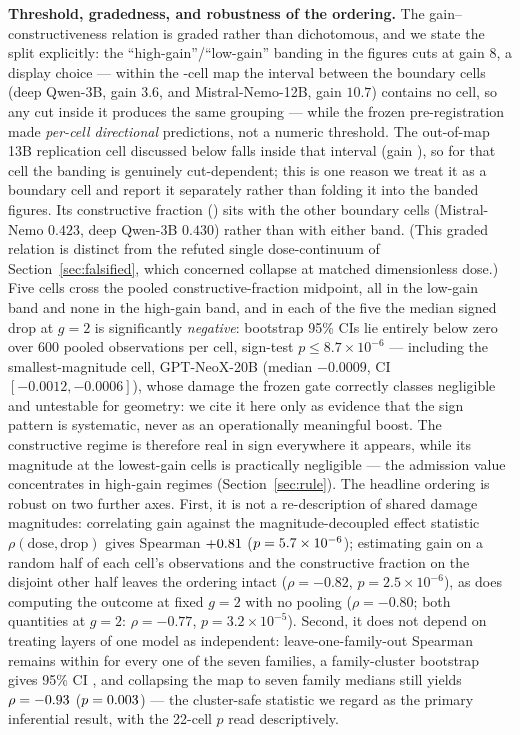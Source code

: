\documentclass[preprint,12pt]{elsarticle}
\theoremstyle{definition}
\begin{document}
\textbf{Threshold, gradedness, and robustness of the ordering.} The
gain--constructiveness relation is graded rather than dichotomous, and we state the
split explicitly: the ``high-gain''/``low-gain'' banding in the figures cuts at gain
$8$, a display choice --- within the \nCells{}-cell map the interval between the
boundary cells (deep Qwen-3B, gain $3.6$, and Mistral-Nemo-12B, gain $10.7$) contains no
cell, so any cut inside it produces the same grouping --- while the
frozen pre-registration made \emph{per-cell directional} predictions, not a numeric
threshold. The out-of-map 13B replication cell discussed below falls inside that
interval (gain \gainThirteenB{}), so for that cell the banding is genuinely
cut-dependent; this is one reason we treat it as a boundary cell and report it
separately rather than folding it into the banded figures. Its constructive fraction
(\fracThirteenB{}) sits with the other boundary cells (Mistral-Nemo $0.423$, deep
Qwen-3B $0.430$) rather than with either band. (This graded relation is distinct from the refuted single dose-continuum
of Section~\ref{sec:falsified}, which concerned collapse at matched dimensionless
dose.) Five cells cross the pooled constructive-fraction midpoint, all in the
low-gain band and none in the high-gain band, and in each of the five the median
signed drop at $g{=}2$ is significantly \emph{negative}: bootstrap 95\% CIs lie
entirely below zero over 600 pooled observations per cell, sign-test
$p\leq 8.7\times10^{-6}$ --- including the smallest-magnitude cell, GPT-NeoX-20B
(median $-0.0009$, CI $[-0.0012,-0.0006]$), whose damage the frozen gate correctly
classes negligible and untestable for geometry: we cite it here only as evidence that
the sign pattern is systematic, never as an operationally meaningful boost. The
constructive regime is therefore real in sign everywhere it appears, while its
magnitude at the lowest-gain cells is practically negligible --- the admission value
concentrates in high-gain regimes (Section~\ref{sec:rule}). The headline ordering is
robust on two further axes. First, it is not a re-description of shared damage
magnitudes: correlating gain against the magnitude-decoupled effect statistic
$\rho(\mathrm{dose},\mathrm{drop})$ gives Spearman $+0.81{}$
($p=5.7\times10^{-6}{}$); estimating gain on a random half of each cell's observations
and the constructive fraction on the disjoint other half leaves the ordering intact
($\rho=-0.82$, $p=2.5\times10^{-6}$), as does computing the outcome at fixed $g{=}2$
with no pooling ($\rho=-0.80$; both quantities at $g{=}2$: $\rho=-0.77$,
$p=3.2\times10^{-5}$). Second, it does not depend on treating layers of one model as
independent: leave-one-family-out Spearman remains within \lofoRange{} for every one
of the seven families, a family-cluster bootstrap gives 95\% CI \famBootCI{}, and
collapsing the map to seven family medians still yields $\rho=-0.93{}$
($p=0.003{}$) --- the cluster-safe statistic we regard as the primary
inferential result, with the 22-cell $p$ read descriptively.
\end{document}

